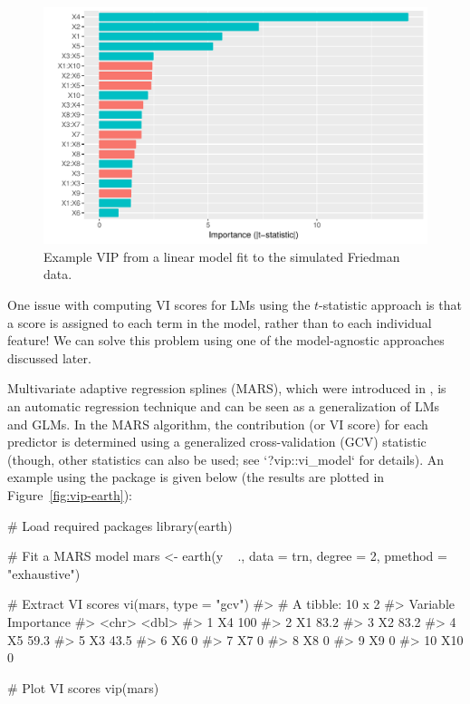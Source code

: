 \begin{figure}[!htb]
  \centering 
  \includegraphics[width=1\linewidth]{figures/vip-step} 
  \caption{Example VIP from a linear model fit to the simulated Friedman data.}
  \label{fig:vip-step}
\end{figure}

One issue with computing VI scores for LMs using the $t$-statistic approach is that a score is assigned to each term in the model, rather than to each individual feature! We can solve this problem using one of the model-agnostic approaches discussed later.

Multivariate adaptive regression splines (MARS), which were introduced in \citet{multivariate-friedman-1991}, is an automatic regression technique and can be seen as a generalization of LMs and GLMs. In the MARS algorithm, the contribution (or VI score) for each predictor is determined using a generalized cross-validation (GCV) statistic (though, other statistics can also be used; see `?vip::vi\_model` for details). An example using the  package \citep{earth-pkg} is given below (the results are plotted in Figure~\ref{fig:vip-earth}):

\begin{example}
# Load required packages
library(earth)

# Fit a MARS model
mars <- earth(y ~ ., data = trn, degree = 2, pmethod = "exhaustive")

# Extract VI scores
vi(mars, type = "gcv")
#> # A tibble: 10 x 2
#>    Variable Importance
#>    <chr>         <dbl>
#>  1 X4            100  
#>  2 X1             83.2
#>  3 X2             83.2
#>  4 X5             59.3
#>  5 X3             43.5
#>  6 X6              0  
#>  7 X7              0  
#>  8 X8              0  
#>  9 X9              0  
#> 10 X10             0

# Plot VI scores
vip(mars)
\end{example}

